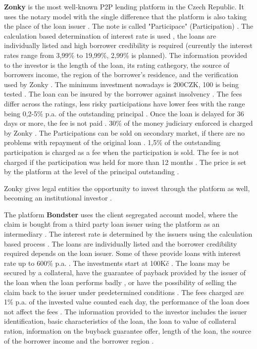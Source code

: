 \textbf{Zonky} is the most well-known P2P lending platform in the Czech Republic. It uses the notary model with the single difference that the platform is also taking the place of the loan issuer \cite[]{ZonkyOPParticipace, ZonkySmlouvaHotUv}. The note is called "Participace" (Participation) \cite[]{ZonkyOPParticipace}. The calculation based determination of interest rate is used \cite[]{ZonkyFAQ}, the loans are individually listed \cite[]{ZonkyTrziste} and high borrower credibility is required (currently the interest rates range from 3,99\% to 19,99\%, 2,99\% is planned)\cite[]{ZonkyFAQ}. The information provided to the investor is the length of the loan, its rating cathegory, the source of borrowers income, the region of the borrower's residence, and the verification used by Zonky \cite[]{ZonkyTrziste}. The minimum investment nowadays is 200CZK, 100 is being tested \cite[]{ZonkyFAQI}. The loan can be insured by the borrower against insolvency \cite[]{ZonkyPoj}. The fees differ across the ratings, less risky participations have lower fees with the range being 0,2-5\% p.a. of the outstanding principal \cite[]{ZonkySazI}. Once the loan is delayed for 36 days or more, the fee is not paid \cite[]{ZonkyFAQI}. 30\% of the money judiciary enforced is charged by Zonky \cite[]{ZonkySazI}. The Participations can be sold on secondary market, if there are no problems with repayment of the original loan \cite[]{ZonkyParametryST}. 1,5\% of the outstanding participation is charged as a fee when the participation is sold. The fee is not charged if the participation was held for more than 12 months \cite[]{ZonkySazI}. The price is set by the platform at the level of the principal outstanding \cite[]{ZonkyFAQI}.

Zonky gives legal entities the opportunity to invest through the platform as well, becoming an institutional investor \cite[]{ZonkyFAQI}.

The platform \textbf{Bondster} uses the client segregated account model, where the claim is bought from a third party loan issuer using the platform as an intermediary \cite[]{BondsterSmlouvaPostPoh}. The interest rate is determined by the issuers using the calculation based process \cite[]{BondsterSmlouvaPostPoh}. The loans are individually listed \cite[]{BondsterTrziste} and the borrower credibility required depends on the loan issuer.  Some of these provide loans with interest rate up to 600\% p.a. \cite[]{BondsterPoskytovatele}. The investments start at 100Kč \cite[]{BondsterFAQ}. The loans may be secured by a collateral, have the guarantee of payback provided by the issuer of the loan when the loan performs badly \cite[]{BondsterZajisteni}, or have the possibility of selling the claim back to the issuer under predetermined conditions \cite[]{BondsterZajisteni, BondsterPodminkyVystoupeni}. The fees charged are 1\% p.a. of the invested value counted each day, the performance of the loan does not affect the fees \cite[]{BondsterSazInv}. The information provided to the investor includes  the issuer identification, basic characteristics of the loan, the loan to value of collateral ration, information on the buyback guarantee offer, length of the loan, the source of the borrower income and the borrower region \cite[]{BondsterTrziste}.

